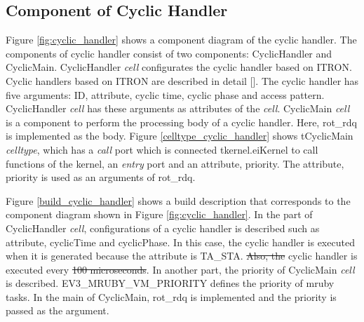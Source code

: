 \documentclass[conference,compsoc]{IEEEtran}
\providecommand{\DIFadd}[1]{{\protect\color{blue}\uwave{#1}}} %
\providecommand{\DIFdel}[1]{{\protect\color{red}\sout{#1}}}                      %
\providecommand{\DIFaddbegin}{} %
\providecommand{\DIFaddend}{} %
\providecommand{\DIFdelbegin}{} %
\providecommand{\DIFdelend}{} %
\begin{document}
\subsection{Component of Cyclic Handler}
Figure \ref{fig:cyclic_handler} shows a component diagram of the cyclic handler.
The components of cyclic handler consist of two components: CyclicHandler and CyclicMain.
CyclicHandler {\it cell} configurates the cyclic handler based on ITRON.
Cyclic handlers based on ITRON are described in detail [].
The cyclic handler has five arguments: ID, attribute, cyclic time, cyclic phase and access pattern.
CyclicHandler {\it cell} has these arguments as attributes of the {\it cell}.
CyclicMain {\it cell} is a component to perform the processing body of a cyclic handler.
Here, rot\_rdq is implemented as the body.
Figure \ref{celltype_cyclic_handler} shows tCyclicMain {\it celltype}, which has a {\it call} port which is connected tkernel.eiKernel to call functions of the kernel, an {\it entry} port and an attribute, priority.
The attribute, priority is used as an arguments of rot\_rdq.

Figure \ref{build_cyclic_handler} shows a build description that corresponds to the component diagram shown in Figure \ref{fig:cyclic_handler}.
In the part of CyclicHandler {\it cell}, configurations of a cyclic handler is described such as attribute, cyclicTime and cyclicPhase.
In this case, the cyclic handler is executed when it is generated because the attribute is TA\_STA.
\DIFdelbegin \DIFdel{Also, the }\DIFdelend \DIFaddbegin \DIFadd{The }\DIFaddend cyclic handler is executed every \DIFdelbegin \DIFdel{100 microseconds}\DIFdelend \DIFaddbegin \DIFadd{1 msec}\DIFaddend .
In another part, the priority of CyclicMain {\it cell} is described.
EV3\_MRUBY\_VM\_PRIORITY defines the priority of mruby tasks.
In the main of CyclicMain, rot\_rdq is implemented and the priority is passed as the argument.
\end{document}
